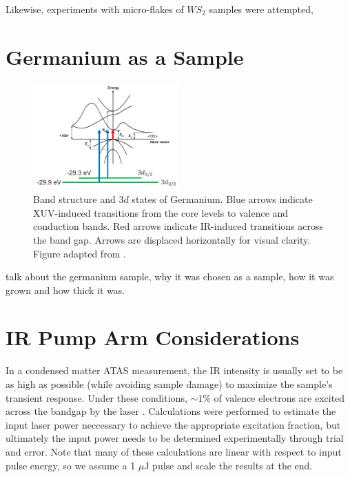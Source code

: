 Likewise, experiments with micro-flakes of $WS_2$ samples were attempted, 



\section{Germanium as a Sample}

\begin{figure}
	\centering
	\includegraphics[width=0.5\textwidth]{figures/chap3/Ge_band_diagram.png}
	\caption{Band structure and $3d$ states of Germanium. Blue arrows indicate XUV-induced transitions from the core levels to valence and conduction bands. Red arrows indicate IR-induced transitions across the band gap. Arrows are displaced horizontally for visual clarity. Figure adapted from \cite{NSMArchivePhysical}.}
	\label{fig:Ge_band_diagram}
\end{figure}


talk about the germanium sample, why it was chosen as a sample, how it was grown and how thick it was.



\section{IR Pump Arm Considerations}


In a condensed matter ATAS measurement, the IR intensity is usually set to be as high as possible (while avoiding sample damage) to maximize the sample's transient response. Under these conditions, $\sim 1\%$ of valence electrons are excited across the bandgap by the laser \cite{zurchDirectSimultaneousObservation2017, schultzeAttosecondBandgapDynamics2014,cushingDifferentiatingPhotoexcitedCarrier2019}. Calculations were performed to estimate the input laser power neccessary to achieve the appropriate excitation fraction, but ultimately the input power needs to be determined experimentally through trial and error. Note that many of these calculations are linear with respect to input pulse energy, so we assume a 1 $\mu$J pulse and scale the results at the end.

